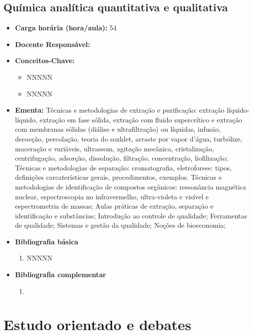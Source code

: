 \documentclass[11pt,fleqn]{book} %
\begin{document}
\subsection{Química analítica quantitativa e qualitativa}\label{disc:analitica}
\begin{itemize}
	\item \textbf{Carga horária (hora/aula):} 54
	\item \textbf{Docente Responsável:}
	\item \textbf{Conceitos-Chave:}
	\begin{itemize}
		\item NNNNN
		\item NNNNN
	\end{itemize}
	\item \textbf{Ementa:} Técnicas e metodologias de extração e purificação: extração líquido-líquido, extração em fase sólida, extração com fluido supercrítico e extração com membranas sólidas (diálise e ultrafiltração) ou líquidas, infusão, decocção, percolação, teoria do soxhlet, arraste por vapor d’água, turbólize, maceração e variáveis, ultrassom, agitação mecânica, cristalização, centrifugação, adsorção, dissolução, filtração, concentração, liofilização; 
	Técnicas e metodologias de separação: cromatografia, eletroforese: tipos, definições carcaterísticas gerais, procedimentos, exemplos. 
	Técnicas e metodologias de identificação de compostos orgânicos: ressonância magnética nuclear, espectroscopia no infravermelho, ultra-violeta e visível e espectrometria de massas; 
	Aulas práticas de extração, separação e identificação e substâncias;
	Introdução ao controle de qualidade; 
	Ferramentas de qualidade; 
	Sistemas e gestão da qualidade;
	Noções de bioeconomia;
	\item \textbf{Bibliografia básica}
	\begin{enumerate}
		\item NNNNN
	\end{enumerate}
	\item \textbf{Bibliografia complementar}
	\begin{enumerate}
		\item 
	\end{enumerate}	
\end{itemize}

\newpage
\section{Estudo orientado e debates}\label{ementasEstudo}
\end{document}
